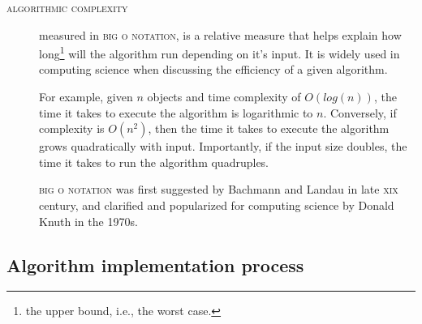 \documentclass[a4paper]{article}
\begin{document}
\begin{description}
    \item[\normalfont\textsc{algorithmic complexity}] measured in \textsc{big o
        notation}, is a relative measure that helps explain how
        long\footnote{the upper bound, i.e., the worst case.} will the
        algorithm run depending on it's input. It is widely used in computing
        science when discussing the efficiency of a given algorithm.

        For example, given $n$ objects and time complexity of $O(log(n))$, the
        time it takes to execute the algorithm is logarithmic to $n$.
        Conversely, if complexity is $O(n^2)$, then the time it takes to
        execute the algorithm grows quadratically with input. Importantly, if
        the input size doubles, the time it takes to run the algorithm
        quadruples.

        \textsc{big o notation} was first suggested by
        Bachmann\cite{bachmann1894analytische} and Landau\cite{landau1911} in
        late \textsc{xix} century, and clarified and popularized for computing
        science by Donald Knuth\cite{knuth1976big} in the 1970s.

\end{description}

\subsection{Algorithm implementation process}

\end{document}
